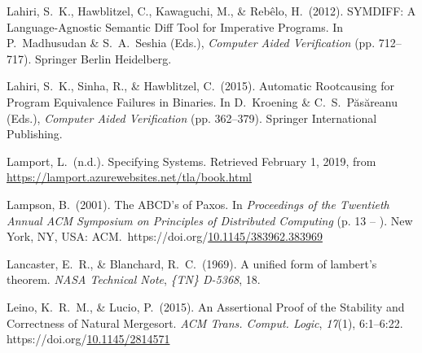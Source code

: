 \documentclass[12pt,twoside]{article}
\begin{document}
{\begin{thebibliography}{222}
\mdbibitemlabel{}Lahiri, S.~K., Hawblitzel, C., Kawaguchi, M., \& Rebêlo, H.~(2012). SYMDIFF: A Language-Agnostic Semantic Diff Tool for Imperative Programs. In P.~Madhusudan \& S.~A.~Seshia (Eds.), \emph{Computer Aided Verification} (pp. 712–717). Springer Berlin Heidelberg.\label{lahiri_symdiff:_2012}%

\mdbibitemlabel{}Lahiri, S.~K., Sinha, R., \& Hawblitzel, C.~(2015). Automatic Rootcausing for Program Equivalence Failures in Binaries. In D.~Kroening \& C.~S.~Păsăreanu (Eds.), \emph{Computer Aided Verification} (pp. 362–379). Springer International Publishing.\label{lahiri_automatic_2015}%

\mdbibitemlabel{}Lamport, L.~(n.d.). Specifying Systems. Retrieved February 1, 2019, from \href{https://lamport.azurewebsites.net/tla/book.html}{{\ttfamily https://\hspace{0pt}lamport.\hspace{0pt}azurewebsites.\hspace{0pt}net/\hspace{0pt}tla/\hspace{0pt}book.\hspace{0pt}html}}\label{lamport_specifying_nodate}%

\mdbibitemlabel{}Lampson, B.~(2001). The ABCD’s of Paxos. In \emph{Proceedings of the Twentieth Annual ACM Symposium on Principles of Distributed Computing} (p. 13 – ). New York, NY, USA: ACM.~https://doi.org/\href{https://dx.doi.org/10.1145/383962.383969}{10.1145/383962.383969}\label{lampson_abcds_2001}%

\mdbibitemlabel{}Lancaster, E.~R., \& Blanchard, R.~C.~(1969). A unified form of lambert’s theorem. \emph{NASA Technical Note}, \emph{\{TN\} D-5368}, 18.\label{lancaster_unified_1969}%

\mdbibitemlabel{}Leino, K.~R.~M., \& Lucio, P.~(2015). An Assertional Proof of the Stability and Correctness of Natural Mergesort. \emph{ACM Trans. Comput. Logic}, \emph{17}(1), 6:1–6:22. https://doi.org/\href{https://dx.doi.org/10.1145/2814571}{10.1145/2814571}\label{leino_assertional_2015}%


\end{thebibliography}}
\end{document}
